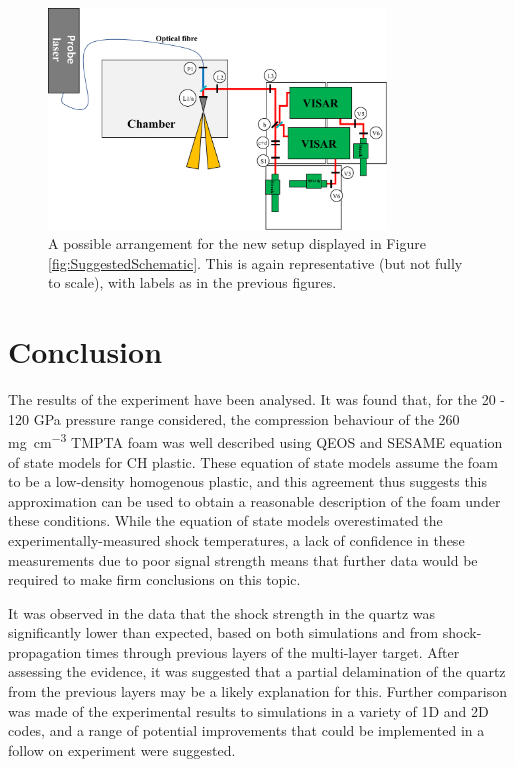 \begin{figure}
\begin{centering}
\includegraphics[width=0.8\textwidth]{figures/Experiment/ImprovedSetup.pdf}%
\caption{\label{fig:SuggestedSetup} A possible arrangement for the new setup displayed in Figure \ref{fig:SuggestedSchematic}. This is again representative (but not fully to scale), with labels as in the previous figures.}
\end{centering}
\end{figure}

\section{Conclusion}
The results of the experiment have been analysed. It was found that, for the 20 - 120 \unit{\giga\pascal} pressure range considered, the compression behaviour of the 260 \unit{\milli\gram\per\centi\meter\cubed} TMPTA foam was well described using QEOS and SESAME equation of state models for CH plastic. These equation of state models assume the foam to be a low-density homogenous plastic, and this agreement thus suggests this approximation can be used to obtain a reasonable description of the foam under these conditions. While the equation of state models overestimated the experimentally-measured shock temperatures, a lack of confidence in these measurements due to poor signal strength means that further data would be required to make firm conclusions on this topic.

It was observed in the data that the shock strength in the quartz was significantly lower than expected, based on both simulations and from shock-propagation times through previous layers of the multi-layer target. After assessing the evidence, it was suggested that a partial delamination of the quartz from the previous layers may be a likely explanation for this. Further comparison was made of the experimental results to simulations in a variety of 1D and 2D codes, and a range of potential improvements that could be implemented in a follow on experiment were suggested.